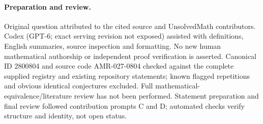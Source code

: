 \documentclass[11pt]{article}
\begin{document}
\paragraph{Preparation and review.}
Original question attributed to the cited source and UnsolvedMath contributors. Codex (GPT-6; exact serving revision not exposed) assisted with definitions, English summaries, source inspection and formatting. No new human mathematical authorship or independent proof verification is asserted. Canonical ID 2800804 and source code AMR-027-0804 checked against the complete supplied registry and existing repository statements; known flagged repetitions and obvious identical conjectures excluded. Full mathematical-equivalence/literature review has not been performed. Statement preparation and final review followed contribution prompts C and D; automated checks verify structure and identity, not open status.
\label{end:2800804}
\end{document}
